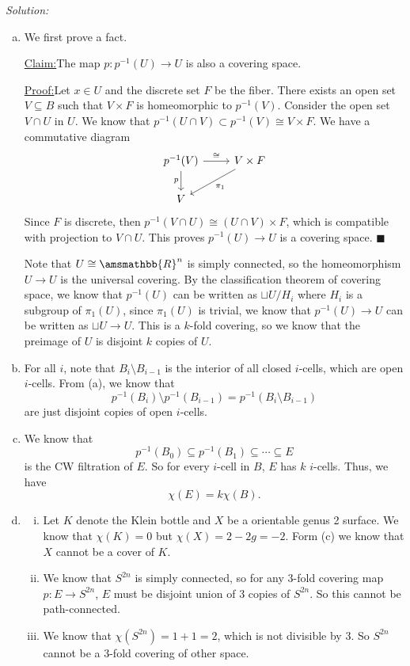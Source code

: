 \documentclass[a4paper, 12pt]{article}
\newenvironment{solution}
    {\textit{Solution:}}
    {}
\newenvironment{claim}[1]{\par\noindent\underline{Claim:}\space#1}{}
\newenvironment{claimproof}[1]{\par\noindent\underline{Proof:}\space#1}{\hfill $\blacksquare$}
\renewcommand{\mathbb}{\amsmathbb}
\begin{document}
\begin{solution}
\begin{enumerate}[(a)]
\item We first prove a fact. 
\begin{claim}
The map \(p:p^{-1}(U)\rightarrow U\) is also a covering space.
\end{claim}
\begin{claimproof}
Let \(x\in U\) and the discrete set \(F\) be the fiber. There exists an open set \(V\subseteq B\) such that \(V\times F\) is homeomorphic to \(p^{-1}(V)\). Consider the open set \(V\cap U\) in \(U\). We know that 
\(p^{-1}(U\cap V)\subset p^{-1}(V)\cong V\times F\). We have a commutative diagram 
\[\begin{tikzcd}
	{p^{-1}(V)} & {V\times F} \\
	V
	\arrow["\cong", from=1-1, to=1-2]
	\arrow["p"', from=1-1, to=2-1]
	\arrow["{\pi_1}", from=1-2, to=2-1]
\end{tikzcd}\]
Since \(F\) is discrete, then \(p^{-1}(V\cap U)\cong (U\cap V)\times F\), which is compatible with projection to \(V\cap U\). This proves \(p^{-1}(U)\rightarrow U\) is a covering space. 
\end{claimproof}

Note that \(U\cong \mathbb{R}^n\) is simply connected, so the homeomorphism \(U\rightarrow U\) is the universal covering. By the classification theorem of covering space, we know that \(p^{-1}(U)\) can be written as \(\sqcup U/H_i\) where \(H_i\) is a subgroup 
of \(\pi_1(U)\), since \(\pi_1(U)\) is trivial, we know that \(p^{-1}(U)\rightarrow U\) can be written as \(\sqcup U\rightarrow U\). This is a \(k\)-fold covering, so we know that the preimage of \(U\) is disjoint \(k\) copies of \(U\).
\item For all \(i\), note that \(B_i\setminus B_{i-1}\) is the interior of all closed \(i\)-cells, which are open \(i\)-cells. From (a), we know that 
\[p^{-1}(B_i)\setminus p^{-1}(B_{i-1})=p^{-1}(B_i\setminus B_{i-1})\]
are just disjoint copies of open \(i\)-cells. 
\item We know that 
\[p^{-1}(B_0)\subseteq p^{-1}(B_1)\subseteq \cdots \subseteq E\]
is the CW filtration of \(E\). So for every \(i\)-cell in \(B\), \(E\) has \(k\) \(i\)-cells. Thus, we have 
\[\chi(E)=k\chi(B).\]
\item \begin{enumerate}[i.]
\item Let \(K\) denote the Klein bottle and \(X\) be a orientable genus 2 surface. We know that 
\(\chi(K)=0\) but \(\chi(X)=2-2g=-2\). 
Form (c) we know that \(X\) cannot be a cover of \(K\). 
\item We know that \(S^{2n}\) is simply connected, so for any 3-fold covering map \(p:E\rightarrow S^{2n}\), \(E\) must be disjoint union of 3 copies of \(S^{2n}\). So this cannot be path-connected. 
\item We know that \(\chi(S^{2n})=1+1=2\), which is not divisible by \(3\). So \(S^{2n}\) cannot be a 3-fold covering of other space.
\end{enumerate}


\end{enumerate}
\end{solution}
\end{document}
